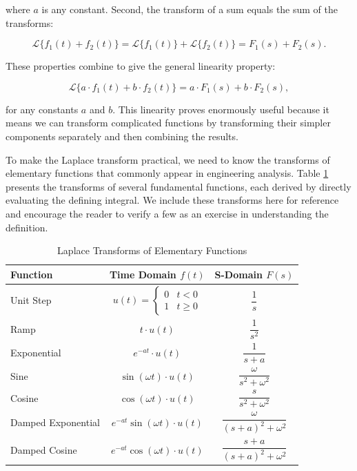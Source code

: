 where $a$ is any constant. Second, the transform of a sum equals the sum of the transforms:

\[
\mathcal{L}\{f_1(t) + f_2(t)\} = \mathcal{L}\{f_1(t)\} + \mathcal{L}\{f_2(t)\} = F_1(s) + F_2(s).
\]

These properties combine to give the general linearity property:

\[
\mathcal{L}\{a \cdot f_1(t) + b \cdot f_2(t)\} = a \cdot F_1(s) + b \cdot F_2(s),
\]

for any constants $a$ and $b$. This linearity proves enormously useful because it means we can transform complicated functions by transforming their simpler components separately and then combining the results.

To make the Laplace transform practical, we need to know the transforms of elementary functions that commonly appear in engineering analysis. Table \ref{tab:elementary_laplace_transforms} presents the transforms of several fundamental functions, each derived by directly evaluating the defining integral. We include these transforms here for reference and encourage the reader to verify a few as an exercise in understanding the definition.

\begin{table}[h]
\centering
\color{UofSCBlack}
\caption{ Laplace Transforms of Elementary Functions }
\label{tab:elementary_laplace_transforms}
\begin{tabular}{|l|c|c|}
\hline
\rowcolor{UofSCGarnet}
\color{white}\textbf{Function} & \color{white}\textbf{Time Domain $f(t)$} & \color{white}\textbf{S-Domain $F(s)$} \\
\hline
Unit Step & $u(t) = \begin{cases} 0 & t < 0 \\ 1 & t \geq 0 \end{cases}$ & $\dfrac{1}{s}$ \\
\hline
Ramp & $t \cdot u(t)$ & $\dfrac{1}{s^2}$ \\
\hline
Exponential & $e^{-at} \cdot u(t)$ & $\dfrac{1}{s+a}$ \\
\hline
Sine & $\sin(\omega t) \cdot u(t)$ & $\dfrac{\omega}{s^2 + \omega^2}$ \\
\hline
Cosine & $\cos(\omega t) \cdot u(t)$ & $\dfrac{s}{s^2 + \omega^2}$ \\
\hline
Damped Exponential & $e^{-at} \sin(\omega t) \cdot u(t)$ & $\dfrac{\omega}{(s+a)^2 + \omega^2}$ \\
\hline
Damped Cosine & $e^{-at} \cos(\omega t) \cdot u(t)$ & $\dfrac{s+a}{(s+a)^2 + \omega^2}$ \\
\hline
\end{tabular}
\end{table}

